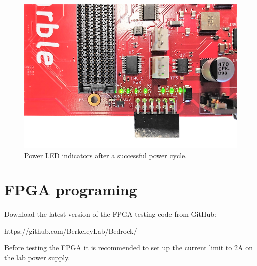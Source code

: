 \documentclass[12pt,oneside,a4]{article}
\begin{document}
\begin{figure}[H]
\begin{center}
\includegraphics[width=0.7\linewidth]{leds.png}
 \caption{Power LED indicators after a successful power cycle.}\label{leds}
\end{center}
\end{figure}

\section{FPGA programing}
Download the latest version of the FPGA testing code from GitHub:
\begin{leftbar}
https://github.com/BerkeleyLab/Bedrock/
\end{leftbar}

\begin{leftbar}
Before testing the FPGA it is recommended to set up the current limit to 2A on the lab power supply.
\end{leftbar}
\end{document}
